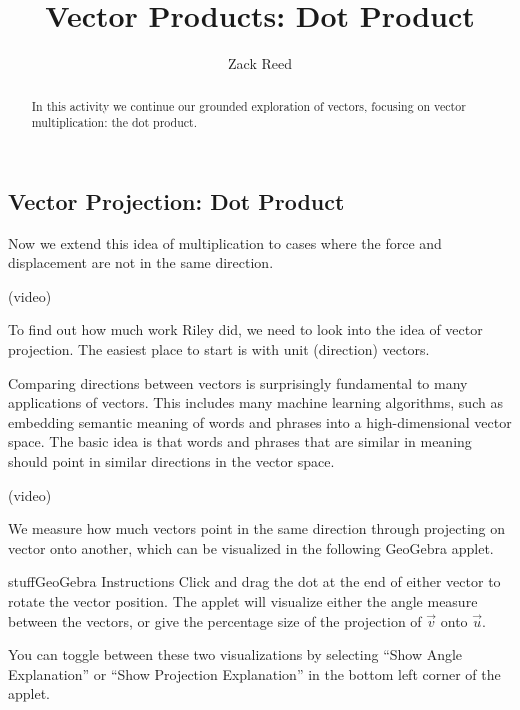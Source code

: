 \documentclass{ximera}
\title{Vector Products: Dot Product}
\author{Zack Reed}
\begin{document}
\begin{abstract}
In this activity we continue our grounded exploration of vectors, focusing on vector multiplication: the dot product.
\end{abstract}
\maketitle


\subsection*{Vector Projection: Dot Product}

Now we extend this idea of multiplication to cases where the force and displacement are not in the same direction.

(video)

To find out how much work Riley did, we need to look into the idea of vector projection. The easiest place to start is with unit (direction) vectors.

Comparing directions between vectors is surprisingly fundamental to many applications of vectors. This includes many machine learning algorithms, such as embedding semantic meaning of words and phrases into a high-dimensional vector space. The basic idea is that words and phrases that are similar in meaning should point in similar directions in the vector space. 

(video)

We measure how much vectors point in the same direction through projecting on vector onto another, which can be visualized in the following GeoGebra applet.

\begin{expandable}{stuff}{GeoGebra Instructions}
    Click and drag the dot at the end of either vector to rotate the vector position. The applet will visualize either the angle measure between the vectors, or give the percentage size of the projection of $\vec{v}$ onto $\vec{u}$.

    You can toggle between these two visualizations by selecting ``Show Angle Explanation'' or ``Show Projection Explanation'' in the bottom left corner of the applet.
\end{expandable}

\begin{center}
\end{center}
\end{document}
